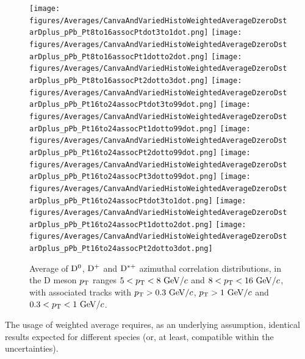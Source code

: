 \begin{figure}
\centering
{\texttt{[image: figures/Averages/CanvaAndVariedHistoWeightedAverageDzeroDstarDplus\_pPb\_Pt8to16assocPtdot3to1dot.png]}}
{\texttt{[image: figures/Averages/CanvaAndVariedHistoWeightedAverageDzeroDstarDplus\_pPb\_Pt8to16assocPt1dotto2dot.png]}}
{\texttt{[image: figures/Averages/CanvaAndVariedHistoWeightedAverageDzeroDstarDplus\_pPb\_Pt8to16assocPt2dotto3dot.png]}}
{\texttt{[image: figures/Averages/CanvaAndVariedHistoWeightedAverageDzeroDstarDplus\_pPb\_Pt16to24assocPtdot3to99dot.png]}}
{\texttt{[image: figures/Averages/CanvaAndVariedHistoWeightedAverageDzeroDstarDplus\_pPb\_Pt16to24assocPt1dotto99dot.png]}}
{\texttt{[image: figures/Averages/CanvaAndVariedHistoWeightedAverageDzeroDstarDplus\_pPb\_Pt16to24assocPt2dotto99dot.png]}}
{\texttt{[image: figures/Averages/CanvaAndVariedHistoWeightedAverageDzeroDstarDplus\_pPb\_Pt16to24assocPt3dotto99dot.png]}}
{\texttt{[image: figures/Averages/CanvaAndVariedHistoWeightedAverageDzeroDstarDplus\_pPb\_Pt16to24assocPtdot3to1dot.png]}}
{\texttt{[image: figures/Averages/CanvaAndVariedHistoWeightedAverageDzeroDstarDplus\_pPb\_Pt16to24assocPt1dotto2dot.png]}}
{\texttt{[image: figures/Averages/CanvaAndVariedHistoWeightedAverageDzeroDstarDplus\_pPb\_Pt16to24assocPt2dotto3dot.png]}}
 \caption{Average of ${\rm D^0}$, ${\rm D^+}$ and ${\rm D^{*+}}$ azimuthal correlation distributions, in the D meson $p_{\rm T}$ ranges $5<p_{\rm T}<8~\mathrm{GeV}/c$ and $8<p_{\rm T}<16~\mathrm{GeV}/c$, with associated tracks with $p_{\rm T}>0.3~\mathrm{GeV}/c$, $p_{\rm T}>1~\mathrm{GeV}/c$ and $0.3 < p_{\rm T} < 1~\mathrm{GeV}/c$.}
 \label{fig:DmesonAverage}
\end{figure}

The usage of weighted average requires, as an underlying assumption, identical results expected for different species (or, at least, compatible within the uncertainties). 


